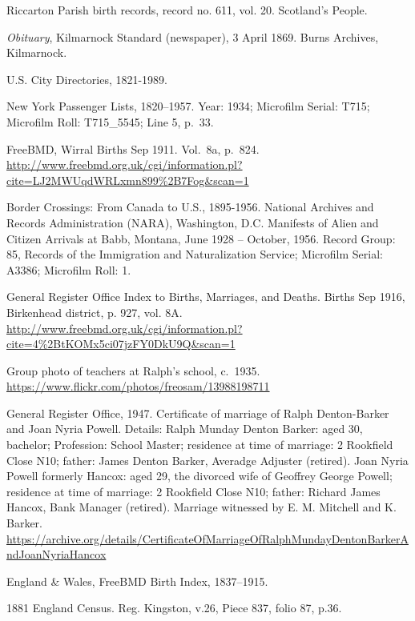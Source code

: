 \begin{thebibliography}{99}
	Riccarton Parish birth records, record no. 611, vol. 20. Scotland's People.

	\emph{Obituary}, Kilmarnock Standard (newspaper), 3 April 1869. Burns Archives, Kilmarnock.

	U.S. City Directories, 1821-1989.

	New York Passenger Lists, 1820--1957. Year: 1934; Microfilm Serial: T715; Microfilm Roll: T715\_5545; Line 5, p.\ 33.

	FreeBMD, Wirral Births Sep 1911. Vol.\ 8a, p.\ 824.
	\url{http://www.freebmd.org.uk/cgi/information.pl?cite=LJ2MWUqdWRLxmn899\%2B7Fog&scan=1}


	Border Crossings: From Canada to U.S., 1895-1956.
	National Archives and Records Administration (NARA), Washington, D.C.
	Manifests of Alien and Citizen Arrivals at Babb, Montana, June 1928 -- October, 1956.
	Record Group: 85, Records of the Immigration and Naturalization Service; Microfilm Serial: A3386; Microfilm Roll: 1.

	General Register Office Index to Births, Marriages, and Deaths.
	Births Sep 1916, Birkenhead district, p. 927, vol. 8A.
	\url{http://www.freebmd.org.uk/cgi/information.pl?cite=4\%2BtKOMx5ci07jzFY0DkU9Q&scan=1}

	Group photo of teachers at Ralph's school, c.\ 1935.
	\url{https://www.flickr.com/photos/freosam/13988198711}

	General Register Office, 1947. Certificate of marriage of Ralph Denton-Barker and Joan Nyria Powell.
	Details: Ralph Munday Denton Barker: aged 30, bachelor; Profession: School Master;
	residence at time of marriage: 2 Rookfield Close N10; father: James Denton Barker, Averadge Adjuster (retired).
	Joan Nyria Powell formerly Hancox: aged 29, the divorced wife of Geoffrey George Powell;
	residence at time of marriage: 2 Rookfield Close N10; father: Richard James Hancox, Bank Manager (retired).
	Marriage witnessed by E. M. Mitchell and K. Barker.
	\url{https://archive.org/details/CertificateOfMarriageOfRalphMundayDentonBarkerAndJoanNyriaHancox}

	England \& Wales, FreeBMD Birth Index, 1837--1915.

	1881 England Census. Reg. Kingston, v.26, Piece 837, folio 87, p.36.


\end{thebibliography}

